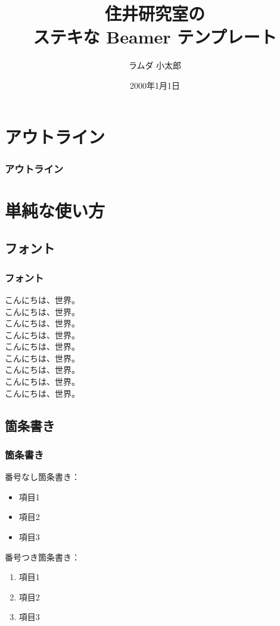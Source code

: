 \documentclass[dvipdfmx,cjk,xcolor=dvipsnames,envcountsect,notheorems,12pt]{beamer}
\title{住井研究室の\\ステキな Beamer テンプレート}
\author{ラムダ 小太郎}
\institute[東北大学　住井・松田研]{東北大学　大学院　情報科学研究科\\住井・松田研究室}%
\date{2000年1月1日}
\theoremstyle{definition}
\begin{document}
\frame[plain]{\titlepage}%

\section*{アウトライン}

\begin{frame}
  \frametitle{アウトライン}
  \tableofcontents[sectionstyle=show,subsectionstyle=hide]
\end{frame}

\section{単純な使い方}

\subsection{フォント}

\begin{frame}
  \frametitle{フォント}
  {\scriptsize こんにちは、世界。}\\
  {\footnotesize こんにちは、世界。}\\
  {\small こんにちは、世界。}\\
  こんにちは、世界。\\%
  {\large こんにちは、世界。}\\
  {\Large こんにちは、世界。}\\
  {\LARGE こんにちは、世界。}\\
  {\Huge こんにちは、世界。}
  \vfill%
  \\%
  \alert{こんにちは、世界。}%
\end{frame}

\subsection{箇条書き}

\begin{frame}
  \frametitle{箇条書き}
  番号なし箇条書き：
  \begin{itemize}
  \item 項目1
  \item 項目2
  \item 項目3
  \end{itemize}
  番号つき箇条書き：
  \begin{enumerate}
  \item 項目1
  \item 項目2
  \item 項目3
  \end{enumerate}
\end{frame}
\end{document}
